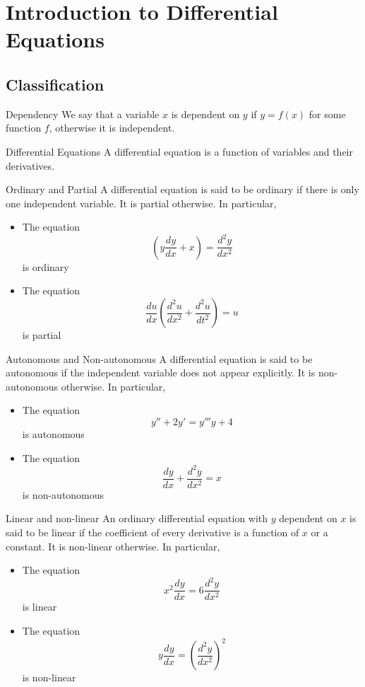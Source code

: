 \documentclass[a4paper]{article}
\begin{document}
\section{Introduction to Differential Equations}
\subsection{Classification}
\begin{defn}{Dependency}{} We say that a variable $x$ is dependent on $y$ if $y=f(x)$ for some function $f$, otherwise it is independent. 
\end{defn}

\begin{defn}{Differential Equations}{} A differential equation is a function of variables and their derivatives. 
\end{defn}

\begin{defn}{Ordinary and Partial}{} A differential equation is said to be ordinary if there is only one independent variable. It is partial otherwise. In particular,
\begin{itemize}
\item The equation $$\left(y\frac{dy}{dx}+x\right)=\frac{d^2y}{dx^2}$$ is ordinary
\item The equation $$\frac{du}{dx}\left(\frac{d^2u}{dx^2}+\frac{d^2u}{dt^2}\right)=u$$ is partial
\end{itemize}
\end{defn}

\begin{defn}{Autonomous and Non-autonomous}{} A differential equation is said to be autonomous if the independent variable does not appear explicitly.  It is non-autonomous otherwise. In particular,
\begin{itemize}
\item The equation $$y''+2y'=y'''y+4$$ is autonomous
\item The equation $$\frac{dy}{dx}+\frac{d^2y}{dx^2}=x$$ is non-autonomous
\end{itemize}
\end{defn}

\begin{defn}{Linear and non-linear}{} An ordinary differential equation with $y$ dependent on $x$ is said to be linear if the coefficient of every derivative is a function of $x$ or a constant. It is non-linear otherwise. In particular,
\begin{itemize}
\item The equation $$x^2\frac{dy}{dx}=6\frac{d^2y}{dx^2}$$ is linear
\item The equation $$y\frac{dy}{dx}=\left(\frac{d^2y}{dx^2}\right)^2$$ is non-linear
\end{itemize}
\end{defn}
\end{document}
